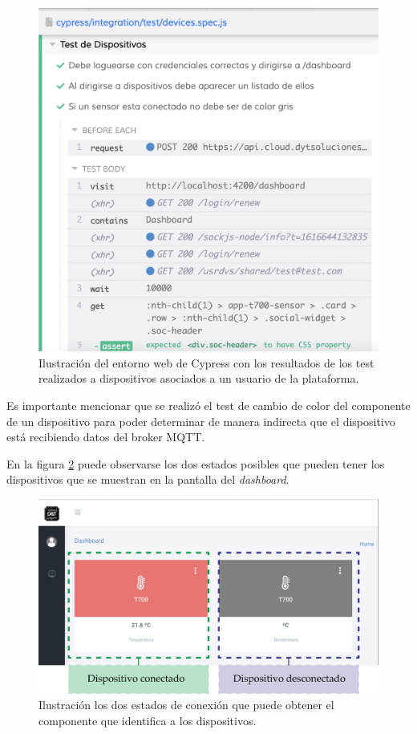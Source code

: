 \begin{figure}[htpb]
	\centering
	\includegraphics[scale=.60]{./Figures/test-devs-cypress.png}
	\caption[Resultado de test de dispositivos de la plataforma web]{Ilustración del entorno web de Cypress con los resultados de los test realizados a dispositivos asociados a un usuario de la plataforma.}
	\label{fig:cypress-test-devs}
\end{figure}

\pagebreak
Es importante mencionar que se realizó el test de cambio de color del componente de un dispositivo para poder determinar de manera indirecta que el dispositivo está recibiendo datos del broker MQTT.  

En la figura \ref{fig:status-devs} puede observarse los dos estados posibles que pueden tener los dispositivos que se muestran en la pantalla del \textit{dashboard}.  

\begin{figure}[htpb]
	\centering
	\includegraphics[scale=.75]{./Figures/estado-devs.png}
	\caption[Estados de conexión de componente de dispositivo]{Ilustración los dos estados de conexión que puede obtener el componente que identifica a los dispositivos.}
	\label{fig:status-devs}
\end{figure}


